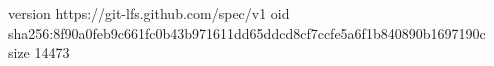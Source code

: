 version https://git-lfs.github.com/spec/v1
oid sha256:8f90a0feb9c661fc0b43b971611dd65ddcd8cf7ccfe5a6f1b840890b1697190c
size 14473
